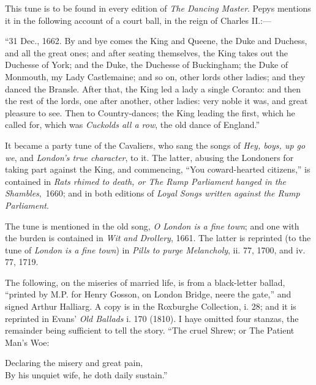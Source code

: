 


This tune is to be found in every edition of \textit{The Dancing Master}. Pepys
mentions it in the following account of a court ball, in the reign of Charles II.:—

“31 Dec., 1662. By and bye comes the King and Queene, the Duke and
Duchess, and all the great ones; and after seating themselves, the King takes out the
Duchesse of York; and the Duke, the Duchesse of Buckingham; the Duke of
Monmouth, my Lady Castlemaine; and so on, other lords other ladies; and they
danced the Bransle. After that, the King led a lady a single Coranto: and then the
rest of the lords, one after another, other ladies: very noble it was, and great pleasure
to see. Then to Country-dances; the King leading the first, which he called for,
which was \textit{Cuckolds all a row}, the old dance of England.”

It became a party tune of the Cavaliers, \pagebreak who sang the songs of \textit{Hey, boys, up
go we}, and \textit{London’s true character}, to it. The latter, abusing the Londoners for
taking part against the King, and commencing, “You coward-hearted citizens,”
is contained in \textit{Rats rhimed to death, or The Rump Parliament hanged in the
Shambles},~1660; and in both editions of \textit{Loyal Songs written against the Rump
Parliament}.

The tune is mentioned in the old song, \textit{O London is a fine town}; and one with
the burden is contained in \textit{Wit and Drollery}, 1661. The latter is reprinted (to
the tune of \textit{London is a fine town}) in \textit{ Pills to purge Melancholy}, ii. 77, 1700, and
iv. 77, 1719.

The following, on the miseries of married life, is from a black-letter ballad,
“printed by M.P. for Henry Gosson, on London Bridge, neere the gate,” and
signed Arthur Halliarg. A copy is in the Roxburghe Collection, i. 28; and
it is reprinted in Evans’ \textit{Old Ballads} i. 170 (1810). I haye omitted four stanzas,
the remainder being sufficient to tell the story. “The cruel Shrew; or The
Patient Man’s Woe:
\settowidth{\versewidth}{Straightway she such a noise will make}
\begin{scverse}
Declaring the misery and great pain,\\
By his unquiet wife, he doth daily sustain.”
\end{scverse}

